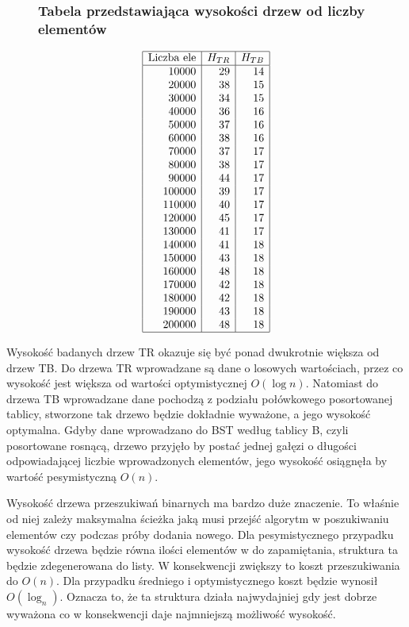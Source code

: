 \documentclass[polish,polish,a4paper]{article}
\begin{document}
\begin{spacing}{1.5}
\begin{figure}[H]
	\subsubsection*{Tabela przedstawiająca wysokości drzew od liczby elementów}
	\centering
	\begin{equation*}
	\begin{array}{|r|r|r|}
	\hline
	\multicolumn{1}{|c|}{$Liczba ele$}&\multicolumn{1}{c|}{H_{TR}}&\multicolumn{1}{c|}{H_{TB}}\\ \hline
10000&29&14\\
20000&38&15\\
30000&34&15\\
40000&36&16\\
50000&37&16\\
60000&38&16\\
70000&37&17\\
80000&38&17\\
90000&44&17\\
100000&39&17\\
110000&40&17\\
120000&45&17\\
130000&41&17\\
140000&41&18\\
150000&43&18\\
160000&48&18\\
170000&42&18\\
180000&42&18\\
190000&43&18\\
200000&48&18\\\hline
	\end{array}
	\end{equation*}
\end{figure}


Wysokość badanych drzew TR okazuje się być ponad dwukrotnie większa od drzew TB. Do drzewa TR wprowadzane są dane o losowych wartościach, przez co wysokość jest większa od wartości optymistycznej $O(\log{n})$. Natomiast do drzewa TB wprowadzane dane pochodzą z podziału połówkowego posortowanej tablicy, stworzone tak drzewo będzie dokładnie wyważone, a jego wysokość optymalna.
Gdyby dane wprowadzano do BST według tablicy B, czyli posortowane rosnącą, drzewo przyjęło by postać jednej gałęzi o długości odpowiadającej liczbie wprowadzonych elementów, jego wysokość osiągnęła by wartość pesymistyczną $ O(n) $.

Wysokość drzewa przeszukiwań binarnych ma bardzo duże znaczenie. To właśnie od niej zależy maksymalna ścieżka jaką musi przejść algorytm w poszukiwaniu elementów czy  podczas próby dodania nowego. Dla pesymistycznego przypadku wysokość drzewa będzie równa ilości elementów w do zapamiętania, struktura ta będzie zdegenerowana do listy. W konsekwencji zwiększy to koszt przeszukiwania do $ O(n) $. Dla przypadku średniego i optymistycznego koszt będzie wynosił $ O(\log_{n}) $. Oznacza to, że ta struktura działa najwydajniej gdy jest dobrze wyważona co w konsekwencji daje najmniejszą możliwość wysokość.


\end{spacing}
\end{document}
